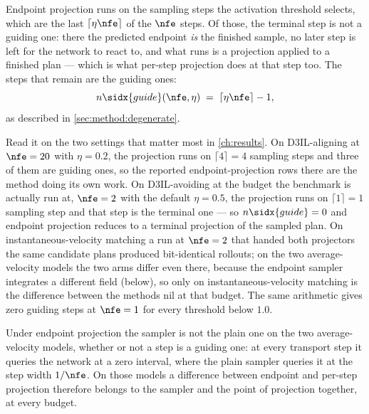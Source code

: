 Endpoint projection runs on the sampling steps the activation threshold selects, which are the last
$\lceil \eta\nfe \rceil$ of the $\nfe$ steps. Of those, the terminal step is not a guiding one: there the
predicted endpoint \emph{is} the finished sample, no later step is left for the network to react to, and
what runs is a projection applied to a finished plan --- which is what per-step projection does at that
step too. The steps that remain are the guiding ones:
%
\begin{equation*}
  n\sidx{guide}(\nfe,\eta) \;=\; \lceil \eta\nfe \rceil - 1 ,
\end{equation*}
%
as described in \autoref{sec:method:degenerate}.

Read it on the two settings that matter most in \autoref{ch:results}. On D3IL-aligning at
$\nfe=20$ with $\eta=0.2$, the projection runs on $\lceil 4 \rceil = 4$ sampling steps and three of them
are guiding ones, so the reported endpoint-projection rows there are the method doing its own work. On
D3IL-avoiding at the budget the benchmark is actually run at, $\nfe=2$ with the default $\eta=0.5$, the
projection runs on $\lceil 1 \rceil = 1$ sampling step and that step is the terminal one --- so
$n\sidx{guide}=0$ and endpoint projection reduces to a terminal projection of the sampled plan. On
instantaneous-velocity matching a run at $\nfe=2$ that handed both projectors the same candidate plans
produced bit-identical rollouts; on the two average-velocity models the two arms differ even there, because
the endpoint sampler integrates a different field (below), so only on instantaneous-velocity matching is the
difference between the methods nil at that budget. The same arithmetic gives zero guiding steps at $\nfe=1$
for every threshold below $1.0$.

Under endpoint projection the sampler is not the plain one on the two average-velocity models, whether or
not a step is a guiding one: at every transport step it queries the network at a zero interval, where the
plain sampler queries it at the step width $1/\nfe$. On those models a difference between endpoint and
per-step projection therefore belongs to the sampler and the point of projection together, at every budget.

